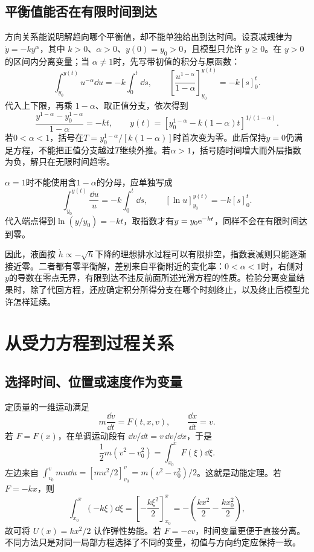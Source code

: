 \subsection{平衡值能否在有限时间到达}
方向关系能说明解趋向哪个平衡值，却不能单独给出到达时间。设衰减规律为 $\dot y=-ky^\alpha$，其中 $k>0$、$\alpha>0$、$y(0)=y_0>0$，且模型只允许 $y\ge0$。在 $y>0$的区间内分离变量；当 $\alpha\ne1$时，先写带初值的积分与原函数：
\[
 \int_{y_0}^{y(t)}u^{-\alpha}\dd u=-k\int_0^t\dd s,
 \qquad
 \left[\frac{u^{1-\alpha}}{1-\alpha}\right]_{y_0}^{y(t)}=-k[s]_0^t.
\]
代入上下限，再乘 $1-\alpha$、取正值分支，依次得到
\[
 \frac{y^{1-\alpha}-y_0^{1-\alpha}}{1-\alpha}=-kt,
 \qquad
 y(t)=\left[y_0^{1-\alpha}-k(1-\alpha)t\right]^{1/(1-\alpha)}.
\]
若$0<\alpha<1$，括号在$T=y_0^{1-\alpha}/[k(1-\alpha)]$时首次变为零。此后保持$y=0$仍满足方程，不能把正值分支越过$T$继续外推。若$\alpha>1$，括号随时间增大而外层指数为负，解只在无限时间趋零。

$\alpha=1$时不能使用含$1-\alpha$的分母，应单独写成
\[
\int_{y_0}^{y(t)}\frac{\dd u}{u}=-k\int_0^t\dd s,
\qquad[\ln u]_{y_0}^{y(t)}=-k[s]_0^t.
\]
代入端点得到$\ln(y/y_0)=-kt$，取指数才有$y=y_0\mathrm e^{-kt}$，同样不会在有限时间达到零。

因此，液面按 $\dot h\propto-\sqrt h$下降的理想排水过程可以有限排空，指数衰减则只能逐渐接近零。二者都有零平衡解，差别来自平衡附近的变化率：$0<\alpha<1$时，右侧对 $y$的导数在零点无界，有限到达不违反前面所述光滑方程的性质。检验分离变量结果时，除了代回方程，还应确定积分所得分支在哪个时刻终止，以及终止后模型允许怎样延续。





\section{从受力方程到过程关系}
\subsection{选择时间、位置或速度作为变量}
定质量的一维运动满足
\[
 m\frac{\dd v}{\dd t}=F(t,x,v),\qquad
 \frac{\dd x}{\dd t}=v.
\]
若 $F=F(x)$，在单调运动段有 $\dd v/\dd t=v\,\dd v/\dd x$，于是
\[
 \frac12m(v^2-v_0^2)=\int_{x_0}^xF(\xi)\dd\xi.
\]
左边来自 $\int_{v_0}^{v}mu\dd u=[mu^2/2]_{v_0}^{v}=m(v^2-v_0^2)/2$。这就是动能定理。若 $F=-kx$，则
\[
 \int_{x_0}^{x}(-k\xi)\dd\xi
 =\left[-\frac{k\xi^2}{2}\right]_{x_0}^{x}
 =-\left(\frac{kx^2}{2}-\frac{kx_0^2}{2}\right),
\]
故可将 $U(x)=kx^2/2$ 认作弹性势能。若 $F=-cv$，时间变量更便于直接分离。不同方法只是对同一局部方程选择了不同的变量，初值与方向约定应保持一致。

